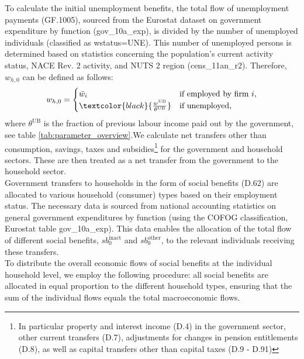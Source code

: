 \noindent  To calculate the initial unemployment benefits, the total flow of unemployment payments (GF.1005), sourced from the Eurostat dataset on government expenditure by function (gov\_10a\_exp), is divided by the number of unemployed individuals (classified as wstatus=UNE). This number of unemployed persons is determined based on statistics concerning the population's current activity status, NACE Rev. 2 activity, and NUTS 2 region (cens\_11an\_r2). Therefore, \(w_{h,0}\) can be defined as follows:
\begin{equation*}
	w_{h,0} = 
	\begin{cases}
		\bar{w}_{i} & \text{if employed by firm $i$}, \\
		\textcolor{black}{\frac{w^{\mathrm{UB}}}{\theta^{\mathrm{UB}}}} & \text{if unemployed},
	\end{cases}
\end{equation*}
where $\theta^{\mathrm{UB}}$ is the fraction of previous labour income paid out by the government, see table \ref{tab:parameter_overview}.We calculate net transfers other than consumption, savings, taxes and subsidies\footnote{In particular property and interest income (D.4) in the government sector, other current transfers (D.7), adjustments for changes in pension entitlements (D.8), as well as capital transfers other than capital taxes (D.9 - D.91)} for the government and household sectors. These are then treated as a net transfer from the government to the household sector. \\

\noindent Government transfers to households in the form of social benefits (D.62) are allocated to various household (consumer) types based on their employment status. The necessary data is sourced from national accounting statistics on general government expenditures by function (using the COFOG classification, Eurostat table gov\_10a\_exp). This data enables the allocation of the total flow of different social benefits, \(sb^{\mathrm{inact}}_{0}\) and \(sb^{\mathrm{other}}_{0}\), to the relevant individuals receiving these transfers.\\

\noindent  To distribute the overall economic flows of social benefits at the individual household level, we employ the following procedure: all social benefits are allocated in equal proportion to the different household types, ensuring that the sum of the individual flows equals the total macroeconomic flows.\\

